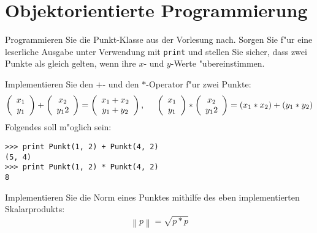\section*{Objektorientierte Programmierung}

\begin{aufgabe}
\begin{teilaufgabe}
Programmieren Sie die Punkt-Klasse aus der Vorlesung nach. Sorgen Sie f"ur eine leserliche Ausgabe unter Verwendung mit \texttt{print} und stellen Sie sicher, dass zwei Punkte als gleich gelten, wenn ihre $x$- und $y$-Werte "ubereinstimmen. \end{teilaufgabe}
\begin{teilaufgabe}
Implementieren Sie den $+$- und den $*$-Operator f"ur zwei Punkte:
\begin{displaymath}
\left(\begin{array}{c}
x_1\\
y_1
\end{array}\right)
+
\left(\begin{array}{c}
x_2\\
y_12
\end{array}\right)
=
\left(\begin{array}{c}
x_1 + x_2\\
y_1 + y_2
\end{array}\right), \hspace{5mm}
\left(\begin{array}{c}
x_1\\
y_1
\end{array}\right)
*
\left(\begin{array}{c}
x_2\\
y_12
\end{array}\right)
= (x_1 * x_2) + (y_1 * y_2)
\end{displaymath}
Folgendes soll m"oglich sein:
\begin{lstlisting}
>>> print Punkt(1, 2) + Punkt(4, 2)
(5, 4)
>>> print Punkt(1, 2) * Punkt(4, 2)
8
\end{lstlisting}
\end{teilaufgabe}

\begin{teilaufgabe}
Implementieren Sie die Norm eines Punktes mithilfe des eben implementierten Skalarprodukts:
\begin{displaymath}
\left\| p\right\| = \sqrt{p*p}
\end{displaymath}
\end{teilaufgabe}
\end{aufgabe}

